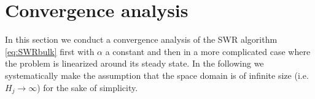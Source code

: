 \section{Convergence analysis} \label{sec:conv-lin}
In this section we conduct a convergence analysis of the SWR algorithm 
\eqref{eq:SWRbulk} first with $\alpha$ a constant and then in a more 
complicated case where the problem is linearized around its 
steady state. In the following we systematically make the assumption 
that the space domain is of infinite size (i.e. $H_j\to\infty$)
for the sake of simplicity.
